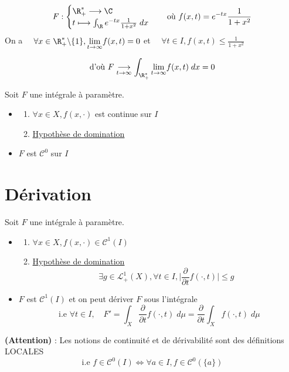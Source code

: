 \begin{example}
    \[ F :
        \begin{cases}
            \R_+^* \longrightarrow \C \\
            t \longmapsto \int_\R e^{-tx} \frac{1}{1 + x^2} \; d x 
        \end{cases} 
        \quad \text{où } f(x,t) = e^{-tx} \frac{1}{1 + x^2} 
    \] 
    On a $\quad \forall x \in \R_+^* \backslash \{1\}, \underset{t \to \infty}{\lim} f(x,t) = 0 $ et $ \quad \forall t \in I, f(x,t) \leq \frac{1}{1 + x^2}$ 

    \[ \text{d'où } F \underset{t \to \infty}{\longrightarrow} \int_{\R_+^*} \underset{t \to \infty}{\lim} f(x,t) \; d x = 0 \]
\end{example}

\newpage

\begin{corollary}
    Soit $F$ une intégrale à paramètre.
    \begin{itemize}
        \item[\textbf{si}]  \begin{enumerate}
                                \item $ \forall x \in X, f(x, \cdot)$ est continue sur $I$
                                \item \underline{Hypothèse de domination}
                            \end{enumerate}
        \item[\textbf{alors}] $F$ est $\mathcal{C}^0$ sur $I$
    \end{itemize}
\end{corollary}

\section{Dérivation}

\begin{theorem}
    Soit $F$ une intégrale à paramètre. 
    \begin{itemize}
        \item[\textbf{si}]  \begin{enumerate}
                                \item $ \forall x \in X, f(x, \cdot) \in \mathcal{C}^1(I)$ 
                                \item \underline{Hypothèse de domination}
                                    \[ \exists g \in \mathcal{L}_+^1(X), \forall t \in I, \Big| \frac{\partial}{\partial t} f(\cdot, t) \Big| \leq g \] 
                            \end{enumerate}
        \item[\textbf{alors}] $F$ est $\mathcal{C}^1(I)$ et on peut dériver $F$ sous l'intégrale 
            \[ \text{i.e } \forall t \in I, \quad F' = \int_X \frac{\partial}{\partial t} f(\cdot, t) \; d \mu = \frac{\partial}{\partial t} \int_X f(\cdot,t) \; d \mu \]
    \end{itemize}
\end{theorem}

\textbf{(Attention)} : Les notions de continuité et de dérivabilité sont des définitions LOCALES
    \[ \text{i.e } f \in \mathcal{C}^0(I) \Longleftrightarrow \forall a \in I, f \in \mathcal{C}^0(\{a\}) \]

